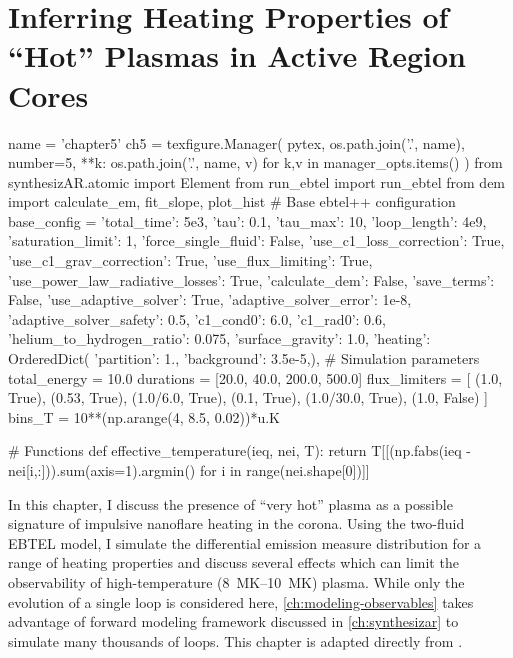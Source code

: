 \chapter{Inferring Heating Properties of ``Hot'' Plasmas in Active Region Cores}\label{ch:inferring_hot_plasma}

\begin{pycode}[chapter5]
name = 'chapter5'
ch5 = texfigure.Manager(
    pytex,
    os.path.join('.', name),
    number=5,
    **{k: os.path.join('.', name, v) for k,v in manager_opts.items()}
)
from synthesizAR.atomic import Element
from run_ebtel import run_ebtel
from dem import calculate_em, fit_slope, plot_hist
# Base ebtel++ configuration
base_config = {
    'total_time': 5e3,
    'tau': 0.1,
    'tau_max': 10,
    'loop_length': 4e9,
    'saturation_limit': 1,
    'force_single_fluid': False,
    'use_c1_loss_correction': True,
    'use_c1_grav_correction': True,
    'use_flux_limiting': True,
    'use_power_law_radiative_losses': True,
    'calculate_dem': False,
    'save_terms': False,
    'use_adaptive_solver': True,
    'adaptive_solver_error': 1e-8,
    'adaptive_solver_safety': 0.5,
    'c1_cond0': 6.0,
    'c1_rad0': 0.6,
    'helium_to_hydrogen_ratio': 0.075,
    'surface_gravity': 1.0,
    'heating': OrderedDict({
        'partition': 1.,
        'background': 3.5e-5,}),
}
# Simulation parameters
total_energy = 10.0
durations = [20.0, 40.0, 200.0, 500.0]
flux_limiters = [
    (1.0, True),
    (0.53, True),
    (1.0/6.0, True),
    (0.1, True),
    (1.0/30.0, True),
    (1.0, False)
]
bins_T = 10**(np.arange(4, 8.5, 0.02))*u.K

# Functions
def effective_temperature(ieq, nei, T):
    return T[[(np.fabs(ieq - nei[i,:])).sum(axis=1).argmin() for i in range(nei.shape[0])]]
\end{pycode}

In this chapter, I discuss the presence of ``very hot'' plasma as a possible signature of impulsive nanoflare heating in the corona. Using the two-fluid EBTEL model, I simulate the differential emission measure distribution for a range of heating properties and discuss several effects which can limit the observability of high-temperature (\SIrange{8}{10}{\mega\kelvin}) plasma. While only the evolution of a single loop is considered here, \autoref{ch:modeling-observables} takes advantage of forward modeling framework discussed in \autoref{ch:synthesizar} to simulate many thousands of loops. This chapter is adapted directly from \citet{barnes_inference_2016}.

